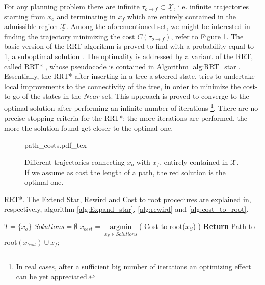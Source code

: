 For any planning problem there are infinite $\tau_{o \rightarrow f} \subset \underline{ \mathcal{X} }$, i.e. infinite trajectories starting from $x_o$ and terminating in $x_f$ which are entirely contained in the admissible region $\underline{ \mathcal{X} }$. Among the aforementioned set, we might be interested in finding the trajectory minimizing the cost $C(\tau_{o \rightarrow f})$, refer to Figure \ref{fig:path_costs}.
The basic version of the RRT algorithm is proved to find with a probability equal to 1, a suboptimal solution \cite{RRT_star}.
The optimality is addressed by a variant of the RRT, called RRT* \cite{RRT_star}, whose pseudocode is contained in Algorithm \ref{alg:RRT_star}.
Essentially, the RRT* after inserting in a tree a steered state, tries to undertake local improvements to the connectivity of the tree, in order to minimize the cost-to-go of the states in the $Near$ set. This approach is proved to converge to the optimal solution after performing an infinite number of iterations \footnote{In real cases, after a sufficient big number of iterations an optimizing effect can be yet appreciated. }. 
There are no precise stopping criteria for the RRT*: the more iterations are performed, the more the solution found get closer to the optimal one.

 \begin{figure}
	 \centering
 \def\svgwidth{0.4 \columnwidth}
 {path_costs.pdf_tex} 
	 \caption{Different trajectories connecting $x_o$ with $x_f$, entirely contained in $\underline{\mathcal{X}}$. If we assume as cost the length of a path, the red solution is the optimal one.}
 \label{fig:path_costs}
 \end{figure}


 \begin{algorithm}
 \caption{RRT*. The Extend$\_$Star, Rewird and Cost$\_$to$\_$root procedures are explained in, respectively, algorithm \ref{alg:Expand_star}, \ref{alg:rewird} and \ref{alg:cost_to_root}.
 \label{alg:RRT_star}}
 $T= \lbrace x_o \rbrace$\; 
 $Solutions = \emptyset$\;
 $x_{best} = \underset{x_S \in Solutions}{\operatorname{argmin}}$( Cost$\_$to$\_$root($x_S$) )\;
 \textbf{Return} Path$\_$to$\_$root$(x_{best}) \cup x_f$;
 \end{algorithm}

